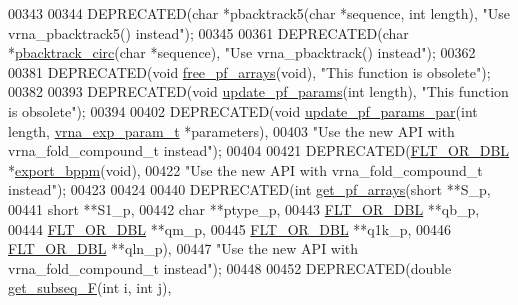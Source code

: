 \begin{DoxyCode}
00343 
00344 DEPRECATED(\textcolor{keywordtype}{char}    *pbacktrack5(\textcolor{keywordtype}{char} *sequence, \textcolor{keywordtype}{int} length), \textcolor{stringliteral}{"Use vrna\_pbacktrack5() instead"});
00345 
00361 DEPRECATED(\textcolor{keywordtype}{char}    *\hyperlink{group__subopt__stochbt_ga00474051204ac9ad576b3e45174d03ff}{pbacktrack\_circ}(\textcolor{keywordtype}{char} *sequence), \textcolor{stringliteral}{"Use vrna\_pbacktrack() instead"});
00362 
00381 DEPRECATED(\textcolor{keywordtype}{void}  \hyperlink{group__pf__fold_gae73db3f49a94f0f72e067ecd12681dbd}{free\_pf\_arrays}(\textcolor{keywordtype}{void}), \textcolor{stringliteral}{"This function is obsolete"});
00382 
00393 DEPRECATED(\textcolor{keywordtype}{void}  \hyperlink{group__pf__fold_ga384e927890f9c034ff09fa66da102d28}{update\_pf\_params}(\textcolor{keywordtype}{int} length), \textcolor{stringliteral}{"This function is obsolete"});
00394 
00402 DEPRECATED(\textcolor{keywordtype}{void} \hyperlink{group__pf__fold_gaafe2d1b21f5418b123b088aa395e827d}{update\_pf\_params\_par}(\textcolor{keywordtype}{int} length, 
      \hyperlink{group__energy__parameters_structvrna__exp__param__s}{vrna\_exp\_param\_t} *parameters),
00403 \textcolor{stringliteral}{"Use the new API with vrna\_fold\_compound\_t instead"});
00404 
00421 DEPRECATED(\hyperlink{group__data__structures_ga31125aeace516926bf7f251f759b6126}{FLT\_OR\_DBL}  *\hyperlink{group__pf__fold_gac5ac7ee281aae1c5cc5898a841178073}{export\_bppm}(\textcolor{keywordtype}{void}),
00422 \textcolor{stringliteral}{"Use the new API with vrna\_fold\_compound\_t instead"});
00423 
00424 
00440 DEPRECATED(\textcolor{keywordtype}{int} \hyperlink{group__pf__fold_ga42faebdfce6f070c5f89adfc8427525c}{get\_pf\_arrays}(\textcolor{keywordtype}{short} **S\_p,
00441                   \textcolor{keywordtype}{short} **S1\_p,
00442                   \textcolor{keywordtype}{char} **ptype\_p,
00443                   \hyperlink{group__data__structures_ga31125aeace516926bf7f251f759b6126}{FLT\_OR\_DBL} **qb\_p,
00444                   \hyperlink{group__data__structures_ga31125aeace516926bf7f251f759b6126}{FLT\_OR\_DBL} **qm\_p,
00445                   \hyperlink{group__data__structures_ga31125aeace516926bf7f251f759b6126}{FLT\_OR\_DBL} **q1k\_p,
00446                   \hyperlink{group__data__structures_ga31125aeace516926bf7f251f759b6126}{FLT\_OR\_DBL} **qln\_p),
00447 \textcolor{stringliteral}{"Use the new API with vrna\_fold\_compound\_t instead"});
00448 
00452 DEPRECATED(\textcolor{keywordtype}{double} \hyperlink{part__func_8h_a189e2a1ec6cc32c53ea72f7543b0441e}{get\_subseq\_F}(\textcolor{keywordtype}{int} i, \textcolor{keywordtype}{int} j),

\end{DoxyCode}
